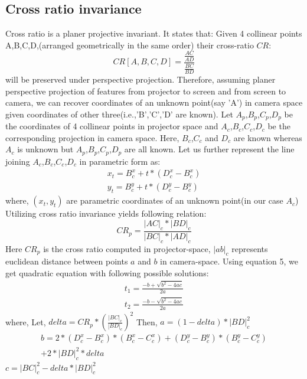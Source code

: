 \documentclass[conference]{/home/pranav/Desktop/Publication_work/latex_class_files/IEEEtran}
\begin{document}
\subsection{Cross ratio invariance}
Cross ratio is a planer projective invariant. It states that: Given 4 collinear points A,B,C,D,(arranged geometrically in the same order) their cross-ratio $CR$:
\begin{equation} 
CR[A,B,C,D]=\frac{\frac{AC}{AD}}{\frac{BC}{BD}}
\label{cross_rat}
\end{equation}
will be preserved under perspective projection. Therefore, assuming planer perspective projection of features from projector to screen and from screen to camera, we can recover coordinates of an unknown point(say 'A') in camera space given coordinates of other three(i.e.,'B','C','D' are known). \newline \newline
Let $A_p$,$B_p$,$C_p$,$D_p$ be the coordinates of 4 collinear points in projector space and $A_c$,$B_c$,$C_c$,$D_c$ be the corresponding projection in camera space. Here, $B_c$,$C_c$ and $D_c$ are known whereas $A_c$ is unknown but $A_p$,$B_p$,$C_p$,$D_p$ are all known. Let us further represent the line joining $A_c$,$B_c$,$C_c$,$D_c$ in parametric form as:
\begin{equation}
\begin{aligned}
x_t=B_c^x+t*(D_c^x-B_c^x)\\
y_t=B_c^y+t*(D_c^y-B_c^y)
\end{aligned}
\label{paramet}
\end{equation}
where, $(x_t,y_t)$ are parametric coordinates of an unknown point(in our case $A_c$)\newline
Utilizing cross ratio invariance yields following relation:
\begin{equation}
CR_p=\frac{|AC|_c*|BD|_c}{|BC|_c*|AD|_c}
\label{cross_rat_eqn}
\end{equation}
Here $CR_p$ is the cross ratio computed in projector-space, $|ab|_c$ represents euclidean distance between points $a$ and $b$ in camera-space. Using equation 5, we get quadratic equation with following possible solutions:
\begin{equation}
\begin{aligned}
t_1=\frac{-b+\sqrt{b^{2}-4ac}}{2a}\\
t_2=\frac{-b-\sqrt{b^{2}-4ac}}{2a}
\end{aligned}
\label{quad_eqn}
\end{equation}
where,\newline
Let,\newline
$delta={CR_p*(\frac{|BC|_c}{|BD|_c})}^2$\newline
Then,
\newline
$a=(1-delta)*|BD|_c^2$\newline
\begin{eqnarray*}
b=2*{(D_c^x-B_c^x)*(B_c^x-C_c^x)+(D_c^y-B_c^y)*(B_c^y-C_c^y)} \\ + 2*|BD|_c^{2}*delta
\end{eqnarray*}
$c=|BC|_c^2-delta*|BD|_c^2$ \newline
\end{document}
